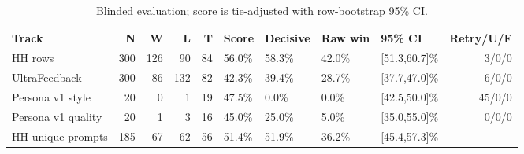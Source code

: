 \begin{table}[t]\centering\small\caption{Blinded evaluation; score is tie-adjusted with row-bootstrap 95\% CI.}\label{tab:blinded}
\begin{tabular}{lrrrrllllr}\toprule Track & N & W & L & T & Score & Decisive & Raw win & 95\% CI & Retry/U/F\\\midrule
HH rows & 300 & 126 & 90 & 84 & 56.0\% & 58.3\% & 42.0\% & [51.3,60.7]\% & 3/0/0\\
UltraFeedback & 300 & 86 & 132 & 82 & 42.3\% & 39.4\% & 28.7\% & [37.7,47.0]\% & 6/0/0\\
Persona v1 style & 20 & 0 & 1 & 19 & 47.5\% & 0.0\% & 0.0\% & [42.5,50.0]\% & 45/0/0\\
Persona v1 quality & 20 & 1 & 3 & 16 & 45.0\% & 25.0\% & 5.0\% & [35.0,55.0]\% & 0/0/0\\
HH unique prompts & 185 & 67 & 62 & 56 & 51.4\% & 51.9\% & 36.2\% & [45.4,57.3]\% & --\\
\bottomrule\end{tabular}\end{table}
